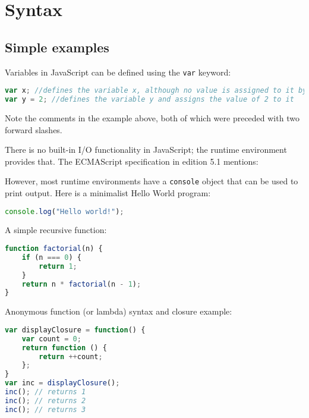 \chapter{Syntax}


\section{Simple examples}


Variables in JavaScript can be defined using the \texttt{var} keyword:

\begin{lstlisting}[language=JavaScript]
var x; //defines the variable x, although no value is assigned to it by default
var y = 2; //defines the variable y and assigns the value of 2 to it
\end{lstlisting}

Note the comments in the example above, both of which were preceded with two forward slashes.

There is no built-in I/O functionality in JavaScript; the runtime environment provides that. The ECMAScript specification in edition 5.1 mentions:


However, most runtime environments have a \texttt{console} object that can be used to print output. Here is a minimalist Hello World program:



\begin{lstlisting}[language=JavaScript]
console.log("Hello world!");
\end{lstlisting}

A simple recursive function:



\begin{lstlisting}[language=JavaScript]
function factorial(n) {
    if (n === 0) {
        return 1;
    }
    return n * factorial(n - 1);
}
\end{lstlisting}

Anonymous function (or lambda) syntax and closure example:




\begin{lstlisting}[language=JavaScript]
var displayClosure = function() {
    var count = 0;
    return function () {
        return ++count;
    };
}
var inc = displayClosure();
inc(); // returns 1
inc(); // returns 2
inc(); // returns 3
\end{lstlisting}

